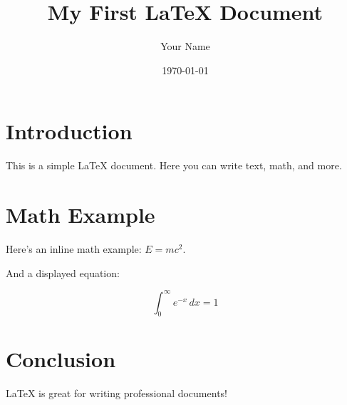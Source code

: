 \documentclass{article}
\title{My First LaTeX Document}
\author{Your Name}
\date{\today}
\begin{document}
\maketitle

\section{Introduction}

This is a simple LaTeX document. Here you can write text, math, and more.

\section{Math Example}

Here’s an inline math example: \( E = mc^2 \).

And a displayed equation:

\[
\int_0^\infty e^{-x} \, dx = 1
\]

\section{Conclusion}

LaTeX is great for writing professional documents!
\end{document}
